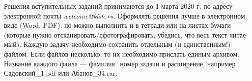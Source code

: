 


Решения вступительных заданий принимаются до 1 марта 2020 г. по адресу электронной почты \textit{welcome\textup{@}klsh.ru}. Оформлять решения лучше в электронном виде (Word, PDF), но можно выполнить и в тетради или на листах бумаги (которые нужно отсканировать/сфотографировать; убедись, что весь текст читае- мый). Каждую задачу необходимо сохранить отдельным (и единственным!) файлом. Если файлов несколько, то их необходимо прислать единым архивом. Название каждого фаила — фамилия\_номер задачи и расширение, например Садовский\_1.pdf или Абанов\_34.rar. 

